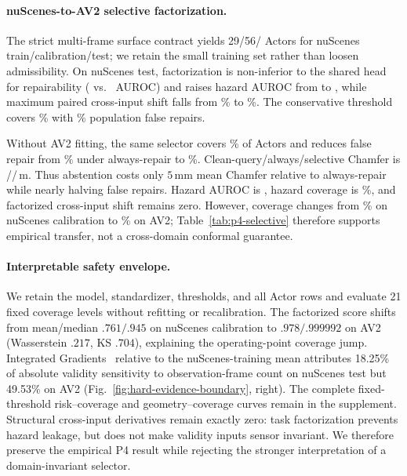 \paragraph{nuScenes-to-AV2 selective factorization.}
The strict multi-frame surface contract yields 29/56/\PfourNuActors{} Actors for nuScenes train/calibration/test; we retain the
small training set rather than loosen admissibility. On nuScenes test, factorization is non-inferior to the shared head for
repairability (\PfourNuFactorRepairAUROC{} vs.\ \PfourNuSharedRepairAUROC{} AUROC) and raises hazard AUROC from
\PfourNuSharedHazardAUROC{} to \PfourNuFactorHazardAUROC{}, while maximum paired cross-input shift falls from
\PfourSharedLeakage{}\% to \PfourFactorLeakage{}\%. The conservative threshold covers \PfourNuFactorCoverage{}\% with
\PfourNuFactorFalseRepair{}\% population false repairs.

Without AV2 fitting, the same selector covers \PfourAVFactorCoverage{}\% of \PfourAVActors{} Actors and reduces false repair
from \PfourAVAlwaysFailure{}\% under always-repair to \PfourAVFactorFalseRepair{}\%. Clean-query/always/selective Chamfer is
\PfourAVQueryChamfer{}/\PfourAVAlwaysChamfer{}/\PfourAVSelectiveChamfer{}\,m. Thus abstention costs only $5$\,mm mean Chamfer
relative to always-repair while nearly halving false repairs. Hazard AUROC is \PfourAVFactorHazardAUROC{}, hazard coverage is
\PfourAVHazardCoverage{}\%, and factorized cross-input shift remains zero. However, coverage changes from
\PfourCalibrationCoverage{}\% on nuScenes calibration to \PfourAVFactorCoverage{}\% on AV2; Table~\ref{tab:p4-selective}
therefore supports empirical transfer, not a cross-domain conformal guarantee.

\paragraph{Interpretable safety envelope.}
We retain the model, standardizer, thresholds, and all Actor rows and evaluate 21 fixed coverage levels without refitting or
recalibration. The factorized score shifts from mean/median $.761/.945$ on nuScenes calibration to $.978/.999992$ on AV2
(Wasserstein $.217$, KS $.704$), explaining the operating-point coverage jump. Integrated Gradients~\cite{sundararajan2017axiomatic}
relative to the nuScenes-training mean attributes 18.25\% of absolute validity sensitivity to observation-frame count on
nuScenes test but 49.53\% on AV2 (Fig.~\ref{fig:hard-evidence-boundary}, right). The complete fixed-threshold risk--coverage and
geometry--coverage curves remain in the supplement. Structural cross-input derivatives remain exactly zero: task factorization
prevents hazard leakage, but does not make validity inputs sensor invariant. We therefore preserve the empirical P4 result while
rejecting the stronger interpretation of a domain-invariant selector.

